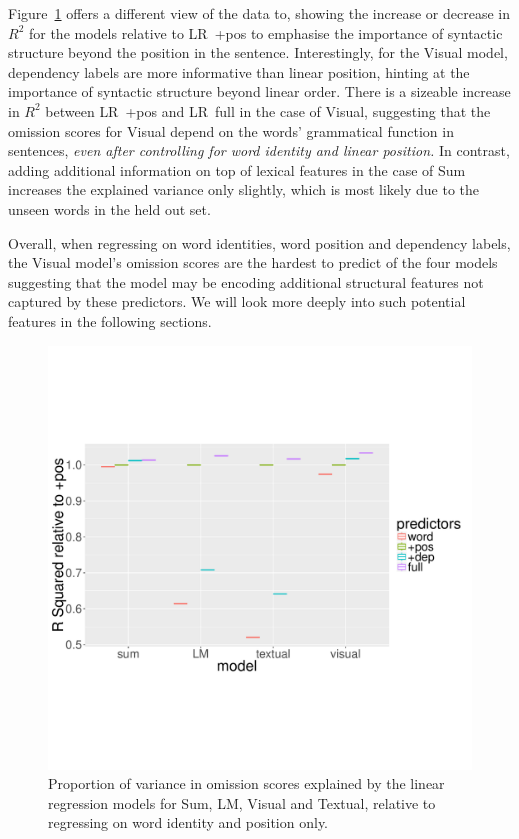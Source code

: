 Figure~\ref{fig:rsquared} offers a different view of the data to, showing
the increase or decrease in $R^2$ for the models relative to {\sc LR~+pos} 
to emphasise the importance of syntactic structure beyond the position in the sentence.
Interestingly, for the {\sc Visual} model, dependency labels are 
more informative than linear position, hinting at the importance of syntactic 
structure beyond linear order. There is a sizeable increase in $R^2$ between 
{\sc LR~+pos} and {\sc LR~full} in the case of {\sc Visual}, suggesting that 
the omission scores for {\sc Visual} depend on the words'
grammatical function in sentences, {\it even after controlling for word
identity and linear position.}  In contrast, adding additional information on
top of lexical features in the case of {\sc Sum} increases the
explained variance only slightly, which is most likely due to the unseen words
in the held out set.   

Overall, when regressing on word identities, word position and
dependency labels, the {\sc Visual} model's omission scores are the
hardest to predict of the four models suggesting that the model may be
encoding additional structural features not captured by these predictors. 
We will look more deeply into such potential features in the following sections.

\begin{figure}
\centering
  \includegraphics[scale=0.35]{position-new.pdf}
\caption{Proportion of variance in omission scores explained by the
  linear regression models
 for {\sc Sum}, {\sc LM}, {\sc Visual} and {\sc Textual}, relative to
 regressing on word identity and position only. }
\label{fig:rsquared}
\end{figure}


